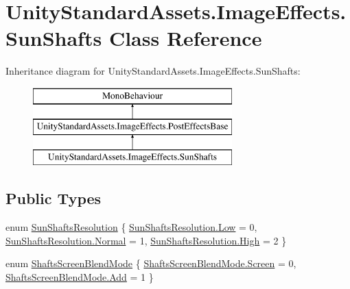 \hypertarget{class_unity_standard_assets_1_1_image_effects_1_1_sun_shafts}{}\section{Unity\+Standard\+Assets.\+Image\+Effects.\+Sun\+Shafts Class Reference}
\label{class_unity_standard_assets_1_1_image_effects_1_1_sun_shafts}
Inheritance diagram for Unity\+Standard\+Assets.\+Image\+Effects.\+Sun\+Shafts\+:\begin{figure}[H]
\begin{center}
\leavevmode
\includegraphics[height=3.000000cm]{class_unity_standard_assets_1_1_image_effects_1_1_sun_shafts}
\end{center}
\end{figure}
\subsection*{Public Types}
\begin{DoxyCompactItemize}
\item 
enum \mbox{\hyperlink{class_unity_standard_assets_1_1_image_effects_1_1_sun_shafts_a6a2e4e71e122d0845ba712e1f3f36b21}{Sun\+Shafts\+Resolution}} \{ \mbox{\hyperlink{class_unity_standard_assets_1_1_image_effects_1_1_sun_shafts_a6a2e4e71e122d0845ba712e1f3f36b21a28d0edd045e05cf5af64e35ae0c4c6ef}{Sun\+Shafts\+Resolution.\+Low}} = 0, 
\mbox{\hyperlink{class_unity_standard_assets_1_1_image_effects_1_1_sun_shafts_a6a2e4e71e122d0845ba712e1f3f36b21a960b44c579bc2f6818d2daaf9e4c16f0}{Sun\+Shafts\+Resolution.\+Normal}} = 1, 
\mbox{\hyperlink{class_unity_standard_assets_1_1_image_effects_1_1_sun_shafts_a6a2e4e71e122d0845ba712e1f3f36b21a655d20c1ca69519ca647684edbb2db35}{Sun\+Shafts\+Resolution.\+High}} = 2
 \}
\item 
enum \mbox{\hyperlink{class_unity_standard_assets_1_1_image_effects_1_1_sun_shafts_a16577ac660a8afd1a280e59000343662}{Shafts\+Screen\+Blend\+Mode}} \{ \mbox{\hyperlink{class_unity_standard_assets_1_1_image_effects_1_1_sun_shafts_a16577ac660a8afd1a280e59000343662a2fc3359e12b2a9104121dcf04246f6a0}{Shafts\+Screen\+Blend\+Mode.\+Screen}} = 0, 
\mbox{\hyperlink{class_unity_standard_assets_1_1_image_effects_1_1_sun_shafts_a16577ac660a8afd1a280e59000343662aec211f7c20af43e742bf2570c3cb84f9}{Shafts\+Screen\+Blend\+Mode.\+Add}} = 1
 \}
\end{DoxyCompactItemize}
